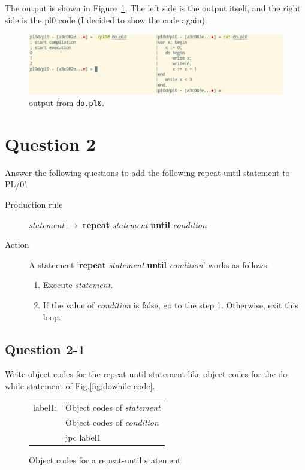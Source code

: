 \documentclass{article}
\begin{document}
\ifreport
The output is shown in Figure~\ref{fig:q13}. The left side is the output itself, and the right side is the pl0 code (I decided to show the code again). \\
\begin{figure}[h]
  \includegraphics[scale=0.35]{./img/Q1-3.png}
  \centering
  \caption{output from {\tt do.pl0}.}
  \label{fig:q13}
\end{figure}
\fi




\newpage
\section*{Question 2}
Answer the following questions to add the following repeat-until statement to PL/0'.

\begin{description}
 \item[Production rule] {\it statement}  $\to$ {\bf repeat} {\it statement} {\bf until} {\it condition}
 \item[Action] A statement '{\bf repeat} {\it statement} {\bf until} {\it condition}' works as follows.
	    \begin{enumerate}
	     \item Execute {\it statement}.
	     \item If the value of {\it condition} is false, go to the step 1. Otherwise, exit this loop.
	    \end{enumerate}
\end{description}

\subsection*{Question 2-1}
Write object codes for the repeat-until statement 
like object codes for the do-while statement of Fig.\ref{fig:dowhile-code}.\\[0.3cm]


\ifreport
\begin{figure}[h]
\begin{tabular}{ll}
label1: & Object codes of {\it statement} \\
        & Object codes of {\it condition} \\
        & jpc label1 \\
\end{tabular}
\caption{Object codes for a repeat-until statement.}
\label{fig:q21}
\end{figure}
\fi
\end{document}

